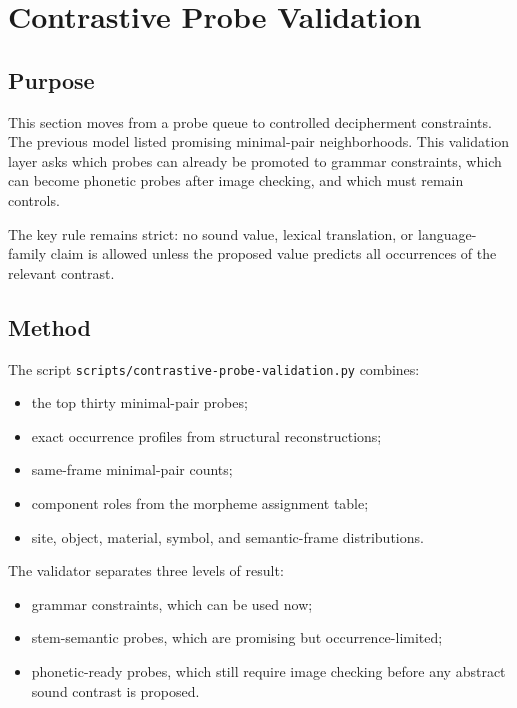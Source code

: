\section{Contrastive Probe Validation}

\subsection{Purpose}

This section moves from a probe queue to controlled decipherment constraints. The previous model listed promising minimal-pair neighborhoods. This validation layer asks which probes can already be promoted to grammar constraints, which can become phonetic probes after image checking, and which must remain controls.

The key rule remains strict: no sound value, lexical translation, or language-family claim is allowed unless the proposed value predicts all occurrences of the relevant contrast.

\subsection{Method}

The script \texttt{scripts/contrastive-probe-validation.py} combines:

\begin{itemize}
  \item the top thirty minimal-pair probes;
  \item exact occurrence profiles from structural reconstructions;
  \item same-frame minimal-pair counts;
  \item component roles from the morpheme assignment table;
  \item site, object, material, symbol, and semantic-frame distributions.
\end{itemize}

The validator separates three levels of result:

\begin{itemize}
  \item grammar constraints, which can be used now;
  \item stem-semantic probes, which are promising but occurrence-limited;
  \item phonetic-ready probes, which still require image checking before any abstract sound contrast is proposed.
\end{itemize}


